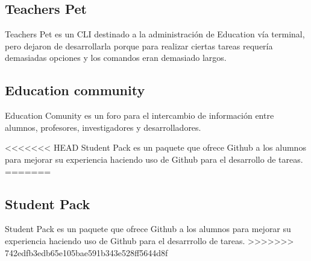 \subsection{Teachers Pet}
Teachers Pet es un CLI destinado a la administración de Education vía terminal, pero dejaron de desarrollarla porque para realizar ciertas tareas requería demasiadas opciones y los comandos eran demasiado largos.

\subsection{Education community}
Education Comunity es un foro para el intercambio de información entre alumnos, profesores, investigadores y desarrolladores.

<<<<<<< HEAD
Student Pack es un paquete que ofrece Github a los alumnos para mejorar su experiencia haciendo uso de Github para el desarrollo de tareas.
=======
\subsection{Student Pack}
Student Pack \cite{B15} es un paquete que ofrece Github a los alumnos para
mejorar su experiencia haciendo uso de Github para el desarrrollo
de tareas.
>>>>>>> 742edfb3edb65e105bae591b343e528ff5644d8f

